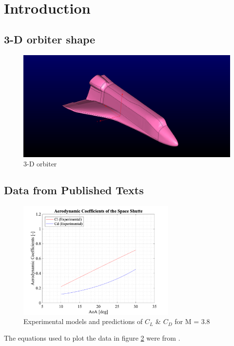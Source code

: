 \section{Introduction}

\subsection{3-D orbiter shape}
\begin{figure}[H]
 \centering
 \includegraphics[width=\textwidth]{report_images/ss_image.png}
 \caption{3-D orbiter}
 \label{fig: ss_image}
\end{figure}

\subsection{Data from Published Texts}

\begin{figure}[H]
 \centering
 \includegraphics[width=0.7\textwidth]{matlab_images/aero_coeff_exp.png}
 \caption{Experimental models and predictions of $C_L$ \& $C_D$ for M = 3.8}
 \label{fig: coeff_exp}
\end{figure}

The equations used to plot the data in figure \ref{fig: coeff_exp} were from \cite{ss_prediction}.

